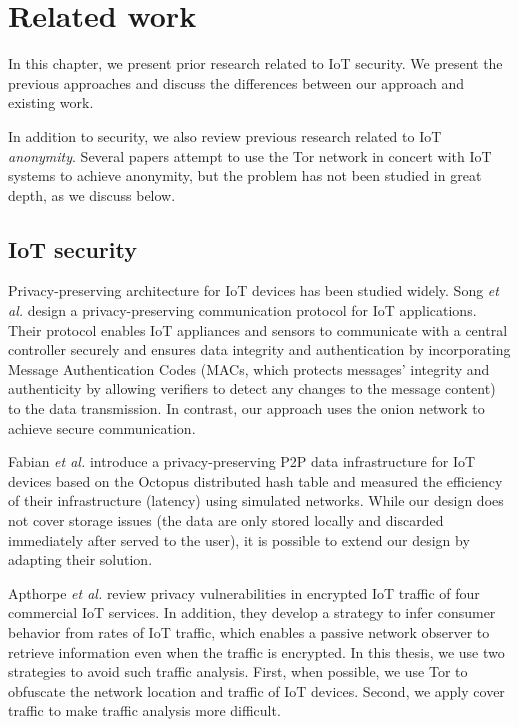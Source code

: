 \chapter{Related work}

In this chapter, we present prior research related to IoT security. We present the previous approaches and discuss the differences between our approach and existing work.

In addition to security, we also review previous research related to IoT \textit{anonymity}. Several papers attempt to use the Tor network in concert with IoT systems to achieve anonymity, but the problem has not been studied in great depth, as we discuss below. 

\section{IoT security}

Privacy-preserving architecture for IoT devices has been studied widely. Song \textit{et al.} \cite{song2017privacy} design a privacy-preserving communication protocol for IoT applications. Their protocol enables IoT appliances and sensors to communicate with a central controller securely and ensures data integrity and authentication by incorporating Message Authentication Codes (MACs, which protects messages' integrity and authenticity by allowing verifiers to detect any changes to the message content) to the data transmission. In contrast, our approach uses the onion network to achieve secure communication.

Fabian \textit{et al.} \cite{fabian2014privacy} introduce a privacy-preserving P2P data infrastructure for IoT devices based on the Octopus distributed hash table \cite{wang2012octopus} and measured the efficiency of their infrastructure (latency) using simulated networks. While our design does not cover storage issues (the data are only stored locally and discarded immediately after served to the user), it is possible to extend our design by adapting their solution.

Apthorpe \textit{et al.} \cite{apthorpe2017smart} review privacy vulnerabilities in encrypted IoT traffic of four commercial IoT services. In addition, they develop a strategy to infer consumer behavior from rates of IoT traffic, which enables a passive network observer to retrieve information even when the traffic is encrypted. In this thesis, we use two strategies to avoid such traffic analysis. First, when possible, we use Tor to obfuscate the network location and traffic of IoT devices. Second, we apply cover traffic to make traffic analysis more difficult.

